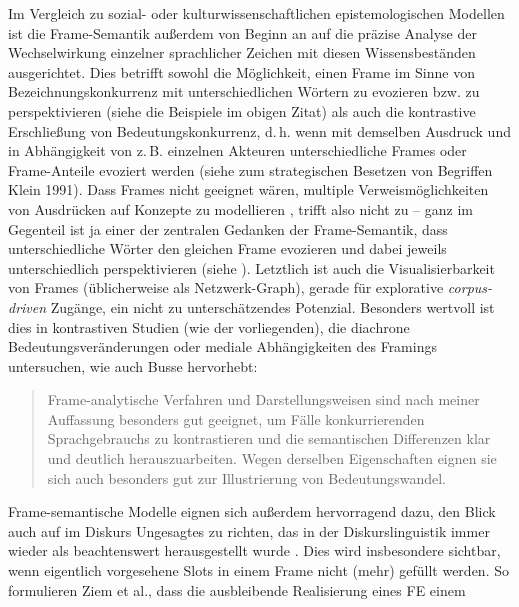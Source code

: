 Im Vergleich zu sozial- oder kulturwissenschaftlichen epistemologischen Modellen ist die Frame-Semantik außerdem von Beginn an auf die präzise Analyse der Wechselwirkung einzelner sprachlicher Zeichen mit diesen Wissensbeständen ausgerichtet. Dies betrifft sowohl die Möglichkeit, einen Frame im Sinne von Bezeichnungskonkurrenz mit unterschiedlichen Wörtern zu evozieren bzw. zu perspektivieren (siehe die Beispiele im obigen Zitat) als auch die kontrastive Erschließung von Bedeutungskonkurrenz, d.\,h. wenn mit demselben Ausdruck und in Abhängigkeit von z.\,B. einzelnen Akteuren unterschiedliche Frames oder Frame-Anteile evoziert werden (siehe zum strategischen Besetzen von Begriffen Klein 1991). Dass Frames nicht geeignet wären, multiple Verweismöglichkeiten von Ausdrücken auf Konzepte zu modellieren \autocite[13-14]{kalwaKonstitutionKonzeptenDiskursen2019}, trifft also nicht zu -- ganz im Gegenteil ist ja einer der zentralen Gedanken der Frame-Semantik, dass unterschiedliche Wörter den gleichen Frame evozieren und dabei jeweils unterschiedlich perspektivieren (siehe ). Letztlich ist auch die Visualisierbarkeit von Frames (üblicherweise als Netzwerk-Graph), gerade für explorative \emph{corpus-driven} Zugänge, ein nicht zu unterschätzendes Potenzial. Besonders wertvoll ist dies in kontrastiven Studien (wie der vorliegenden), die diachrone Bedeutungsveränderungen oder mediale Abhängigkeiten des Framings untersuchen, wie auch Busse hervorhebt:

\begin{quote}
Frame-analytische Verfahren und Darstellungsweisen sind nach meiner Auffassung besonders gut geeignet, um Fälle konkurrierenden Sprachgebrauchs zu kontrastieren und die semantischen Differenzen klar und deutlich herauszuarbeiten. Wegen derselben Eigenschaften eignen sie sich auch besonders gut zur Illustrierung von Bedeutungswandel. \autocite[210-211]{busse33LexikFrameanalytisch2017}
\end{quote}

Frame-semantische Modelle eignen sich außerdem hervorragend dazu, den Blick auch auf im Diskurs Ungesagtes zu richten, das in der Diskurslinguistik immer wieder als beachtenswert herausgestellt wurde \autocites[39]{spitzmullerDiskurslinguistikEinfuhrungTheorien2011}{storjohannPrasenzUndAbsenz2013}[sowie die Beiträge in][]{schroterExploringSilenceAbsence2018a}. Dies wird insbesondere sichtbar, wenn eigentlich vorgesehene Slots in einem Frame nicht (mehr) gefüllt werden. So formulieren Ziem et al., dass die ausbleibende Realisierung eines FE einem


